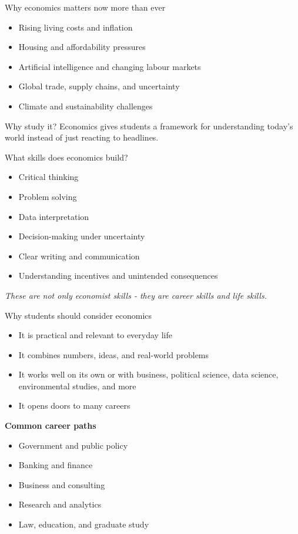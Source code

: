 \documentclass[aspectratio=169,11pt]{beamer}
\begin{document}
\begin{frame}{Why economics matters now more than ever}
\begin{itemize}
    \item Rising living costs and inflation
    \item Housing and affordability pressures
    \item Artificial intelligence and changing labour markets
    \item Global trade, supply chains, and uncertainty
    \item Climate and sustainability challenges
\end{itemize}
\vspace{0.4cm}
\begin{block}{Why study it?}
Economics gives students a framework for understanding today's world instead of just reacting to headlines.
\end{block}
\end{frame}

\begin{frame}{What skills does economics build?}
\begin{itemize}
    \item Critical thinking
    \item Problem solving
    \item Data interpretation
    \item Decision-making under uncertainty
    \item Clear writing and communication
    \item Understanding incentives and unintended consequences
\end{itemize}
\vspace{0.4cm}
\textit{These are not only economist skills - they are career skills and life skills.}
\end{frame}

\begin{frame}{Why students should consider economics}
\begin{itemize}
    \item It is practical and relevant to everyday life
    \item It combines numbers, ideas, and real-world problems
    \item It works well on its own or with business, political science, data science, environmental studies, and more
    \item It opens doors to many careers
\end{itemize}
\vspace{0.4cm}
\textbf{Common career paths}
\begin{itemize}
    \item Government and public policy
    \item Banking and finance
    \item Business and consulting
    \item Research and analytics
    \item Law, education, and graduate study
\end{itemize}
\end{frame}
\end{document}
